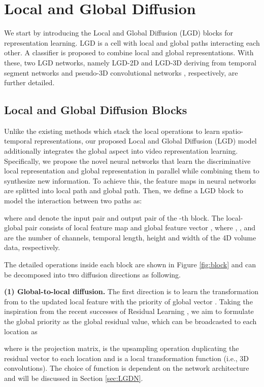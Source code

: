 \documentclass[10pt,twocolumn,letterpaper]{article}
\begin{document}
\section{Local and Global Diffusion}
We start by introducing the Local and Global Diffusion (LGD) blocks for representation learning. LGD is a cell with local and global paths interacting each other. A classifier is proposed to combine local and global representations. With these, two LGD networks, namely LGD-2D and LGD-3D deriving from temporal segment networks \cite{wang2016temporal} and pseudo-3D convolutional networks \cite{qiu2017learning}, respectively, are further detailed.

\subsection{Local and Global Diffusion Blocks}
Unlike the existing methods which stack the local operations to learn spatio-temporal representations, our proposed Local and Global Diffusion (LGD) model additionally integrates the global aspect into video representation learning. Specifically, we propose the novel neural networks that learn the discriminative local representation and global representation in parallel while combining them to synthesize new information. To achieve this, the feature maps in neural networks are splitted into local path and global path. Then, we define a LGD block to model the interaction between two paths as:

where  and  denote the input pair and output pair of the -th block. The local-global pair consists of local feature map  and global feature vector , where , ,  and  are the number of channels, temporal length, height and width of the 4D volume data, respectively.

The detailed operations inside each block  are shown in Figure \ref{fig:block} and can be decomposed into two diffusion directions as following.

\textbf{(1) Global-to-local diffusion.} The first direction is to learn the transformation from  to the updated local feature  with the priority of global vector . Taking the inspiration from the recent successes of Residual Learning \cite{he2015deep}, we aim to formulate the global priority as the global residual value, which can be broadcasted to each location as

where  is the projection matrix,  is the upsampling operation duplicating the residual vector to each location and  is a local transformation function (i.e., 3D convolutions). The choice of function  is dependent on the network architecture and will be discussed in Section \ref{sec:LGDN}.
\end{document}
